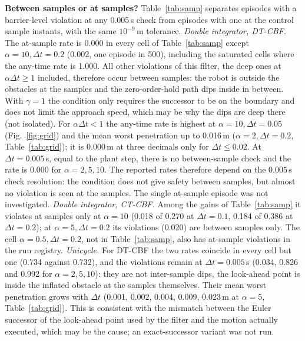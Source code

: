 \textbf{Between samples or at samples?} Table~\ref{tab:samp} separates episodes with a barrier-level violation at any 0.005\,s check from episodes with one at the control sample instants, with the same $10^{-9}$\,m tolerance. \emph{Double integrator, DT-CBF.} The at-sample rate is 0.000 in every cell of Table~\ref{tab:samp} except $\alpha=10,\Delta t=0.2$ (0.002, one episode in 500), including the saturated cells where the any-time rate is 1.000. All other violations of this filter, the deep ones at $\alpha\Delta t\ge1$ included, therefore occur between samples: the robot is outside the obstacles at the samples and the zero-order-hold path dips inside in between. With $\gamma=1$ the condition only requires the successor to be on the boundary and does not limit the approach speed, which may be why the dips are deep there (not isolated). For $\alpha\Delta t<1$ the any-time rate is highest at $\alpha=10,\Delta t=0.05$ (Fig.~\ref{fig:grid}) and the mean worst penetration up to 0.016\,m ($\alpha=2,\Delta t=0.2$, Table~\ref{tab:grid}); it is 0.000\,m at three decimals only for $\Delta t\le0.02$. At $\Delta t=0.005$\,s, equal to the plant step, there is no between-sample check and the rate is 0.000 for $\alpha=2,5,10$. The reported rates therefore depend on the 0.005\,s check resolution: the condition does not give safety between samples, but almost no violation is seen at the samples. The single at-sample episode was not investigated. \emph{Double integrator, CT-CBF.} Among the gains of Table~\ref{tab:samp} it violates at samples only at $\alpha=10$ (0.018 of 0.270 at $\Delta t=0.1$, 0.184 of 0.386 at $\Delta t=0.2$); at $\alpha=5,\Delta t=0.2$ its violations (0.020) are between samples only. The cell $\alpha=0.5,\Delta t=0.2$, not in Table~\ref{tab:samp}, also has at-sample violations in the run registry. \emph{Unicycle.} For DT-CBF the two rates coincide in every cell but one (0.734 against 0.732), and the violations remain at $\Delta t=0.005$\,s (0.034, 0.826 and 0.992 for $\alpha=2,5,10$): they are not inter-sample dips, the look-ahead point is inside the inflated obstacle at the samples themselves. Their mean worst penetration grows with $\Delta t$ (0.001, 0.002, 0.004, 0.009, 0.023\,m at $\alpha=5$, Table~\ref{tab:grid}). This is consistent with the mismatch between the Euler successor of the look-ahead point used by the filter and the motion actually executed, which may be the cause; an exact-successor variant was not run.

\begin{table}[t]\centering\caption{Violation rate at any 0.005\,s check / at control sample instants only (barrier level, tolerance $10^{-9}$\,m), means over 5 seeds. $\Delta t=0.005$\,s equals the plant step. Unicycle CT-CBF (not shown) is at 0.000 / 0.000 for $\Delta t\le0.1$ including 0.005, and both rates equal the Table~\ref{tab:grid} rate at $\Delta t=0.2$; ``--'' as in Table~\ref{tab:grid}.}\label{tab:samp}
\scriptsize\setlength{\tabcolsep}{4pt}\end{table}

